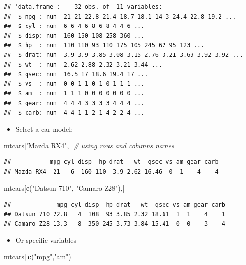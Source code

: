 \documentclass[]{article}
\def\tightlist{}
\newenvironment{Shaded}{\begin{snugshade}}{\end{snugshade}}
\newcommand{\KeywordTok}[1]{\textcolor[rgb]{0.13,0.29,0.53}{\textbf{{#1}}}}
\newcommand{\StringTok}[1]{\textcolor[rgb]{0.31,0.60,0.02}{{#1}}}
\newcommand{\CommentTok}[1]{\textcolor[rgb]{0.56,0.35,0.01}{\textit{{#1}}}}
\newcommand{\NormalTok}[1]{{#1}}
\numberwithin{equation}{section}
\begin{document}
\begin{verbatim}
## 'data.frame':    32 obs. of  11 variables:
##  $ mpg : num  21 21 22.8 21.4 18.7 18.1 14.3 24.4 22.8 19.2 ...
##  $ cyl : num  6 6 4 6 8 6 8 4 4 6 ...
##  $ disp: num  160 160 108 258 360 ...
##  $ hp  : num  110 110 93 110 175 105 245 62 95 123 ...
##  $ drat: num  3.9 3.9 3.85 3.08 3.15 2.76 3.21 3.69 3.92 3.92 ...
##  $ wt  : num  2.62 2.88 2.32 3.21 3.44 ...
##  $ qsec: num  16.5 17 18.6 19.4 17 ...
##  $ vs  : num  0 0 1 1 0 1 0 1 1 1 ...
##  $ am  : num  1 1 1 0 0 0 0 0 0 0 ...
##  $ gear: num  4 4 4 3 3 3 3 4 4 4 ...
##  $ carb: num  4 4 1 1 2 1 4 2 2 4 ...
\end{verbatim}

\begin{itemize}
\tightlist
\item
  Select a car model:
\end{itemize}

\begin{Shaded}
\begin{Highlighting}[]
\NormalTok{mtcars[}\StringTok{"Mazda RX4"}\NormalTok{,] }\CommentTok{# using rows and columns names}
\end{Highlighting}
\end{Shaded}

\begin{verbatim}
##           mpg cyl disp  hp drat   wt  qsec vs am gear carb
## Mazda RX4  21   6  160 110  3.9 2.62 16.46  0  1    4    4
\end{verbatim}

\begin{Shaded}
\begin{Highlighting}[]
\NormalTok{mtcars[}\KeywordTok{c}\NormalTok{(}\StringTok{"Datsun 710"}\NormalTok{, }\StringTok{"Camaro Z28"}\NormalTok{),] }
\end{Highlighting}
\end{Shaded}

\begin{verbatim}
##             mpg cyl disp  hp drat   wt  qsec vs am gear carb
## Datsun 710 22.8   4  108  93 3.85 2.32 18.61  1  1    4    1
## Camaro Z28 13.3   8  350 245 3.73 3.84 15.41  0  0    3    4
\end{verbatim}

\begin{itemize}
\tightlist
\item
  Or specific variables
\end{itemize}

\begin{Shaded}
\begin{Highlighting}[]
\NormalTok{mtcars[,}\KeywordTok{c}\NormalTok{(}\StringTok{"mpg"}\NormalTok{,}\StringTok{"am"}\NormalTok{)]}
\end{Highlighting}
\end{Shaded}
\end{document}
